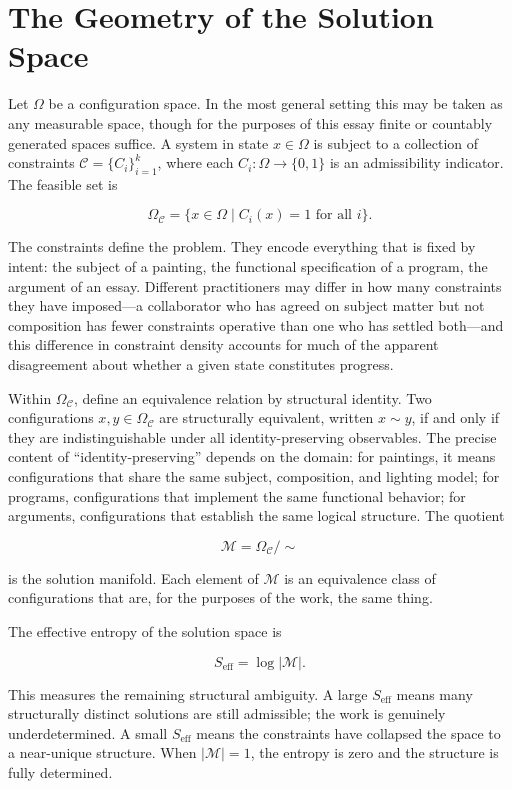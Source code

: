 \documentclass[12pt, twoside]{article}
\theoremstyle{plain}
\theoremstyle{definition}
\theoremstyle{remark}
\newcommand{\OmC}{\Omega_{\mathcal{C}}}
\newcommand{\Seff}{S_{\text{eff}}}
\begin{document}
\section{The Geometry of the Solution Space}
\label{sec:geometry}

Let $\Omega$ be a configuration space. In the most general setting this may be taken as any measurable space, though for the purposes of this essay finite or countably generated spaces suffice. A system in state $x \in \Omega$ is subject to a collection of constraints $\mathcal{C} = \{C_i\}_{i=1}^{k}$, where each $C_i : \Omega \to \{0,1\}$ is an admissibility indicator. The feasible set is

\[
\OmC = \{ x \in \Omega \mid C_i(x) = 1 \text{ for all } i \}.
\]

The constraints define the problem. They encode everything that is fixed by intent: the subject of a painting, the functional specification of a program, the argument of an essay. Different practitioners may differ in how many constraints they have imposed---a collaborator who has agreed on subject matter but not composition has fewer constraints operative than one who has settled both---and this difference in constraint density accounts for much of the apparent disagreement about whether a given state constitutes progress.

Within $\OmC$, define an equivalence relation by structural identity. Two configurations $x, y \in \OmC$ are structurally equivalent, written $x \sim y$, if and only if they are indistinguishable under all identity-preserving observables. The precise content of ``identity-preserving'' depends on the domain: for paintings, it means configurations that share the same subject, composition, and lighting model; for programs, configurations that implement the same functional behavior; for arguments, configurations that establish the same logical structure. The quotient

\[
\mathcal{M} = \OmC / {\sim}
\]

is the solution manifold. Each element of $\mathcal{M}$ is an equivalence class of configurations that are, for the purposes of the work, the same thing.

The effective entropy of the solution space is

\[
\Seff = \log |\mathcal{M}|.
\]

This measures the remaining structural ambiguity. A large $\Seff$ means many structurally distinct solutions are still admissible; the work is genuinely underdetermined. A small $\Seff$ means the constraints have collapsed the space to a near-unique structure. When $|\mathcal{M}| = 1$, the entropy is zero and the structure is fully determined.
\end{document}
